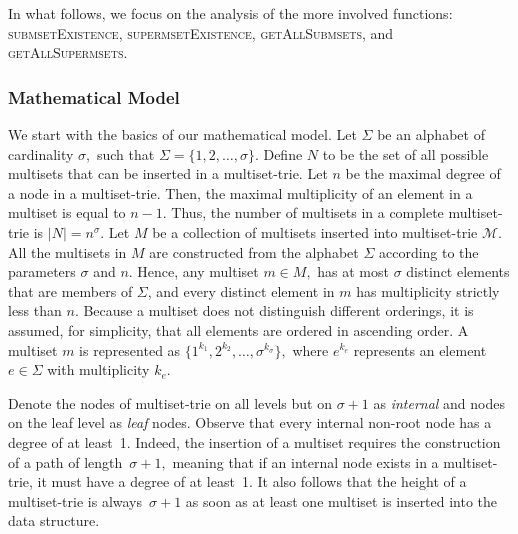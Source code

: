 \documentclass[algorithms,article,accept,pdftex,moreauthors]{Definitions/mdpi}
\begin{document}
In what follows, we focus on the analysis of the more involved functions:
\textsc{submsetExistence}, \textsc{supermsetExistence}, \textsc{getAllSubmsets},
and \textsc{getAllSupermsets}.

\subsubsection{Mathematical Model} \label{ss:mathmodel}
We start with the basics of our mathematical model. Let $\Sigma$ be an alphabet of
cardinality $\sigma,$ such that $\Sigma = \{ 1,2, \ldots, \sigma \}.$ Define $N$
to be the set of all possible multisets that can be inserted in a
multiset-trie. Let $n$ be the maximal degree of a node in a multiset-trie.
Then, the maximal multiplicity of an element in a multiset is equal to $n-1.$
Thus, the number of multisets in a complete multiset-trie is $ |N| = n^{\sigma}.$
%
Let $M$ be a collection of multisets inserted into multiset-trie $\mathcal{M}.$
All the multisets in $M$ are constructed from the alphabet $\Sigma$ according
to the parameters $\sigma$ and $n$. Hence, any multiset $m\in M,$ 
has at most $\sigma$ distinct elements that are members of $\Sigma$, and 
every distinct element in $m$ has multiplicity strictly less than $n.$
%
Because a multiset does not distinguish different orderings, it is assumed, for
simplicity, that all elements are ordered in ascending order. A multiset $m$ is
represented as $\{1^{k_1},2^{k_2},\ldots, \sigma^{k_\sigma}\},$ where $e^{k_e}$
represents an element $e\in\Sigma$ with multiplicity $k_e.$
%

Denote the nodes of multiset-trie on all levels but on $\sigma + 1$ as \emph{internal}
and nodes on the leaf level as \emph{leaf} nodes.
%
Observe that every internal non-root node has a degree of at least~1. Indeed, the
insertion of a multiset requires the construction of a path of length~$\sigma + 1,$
meaning that if an internal node exists in a multiset-trie, it must have a degree of
at least~1. It also follows that the height of a multiset-trie is always~$\sigma +1$
as soon as at least one multiset is inserted into the data structure.
\end{document}
